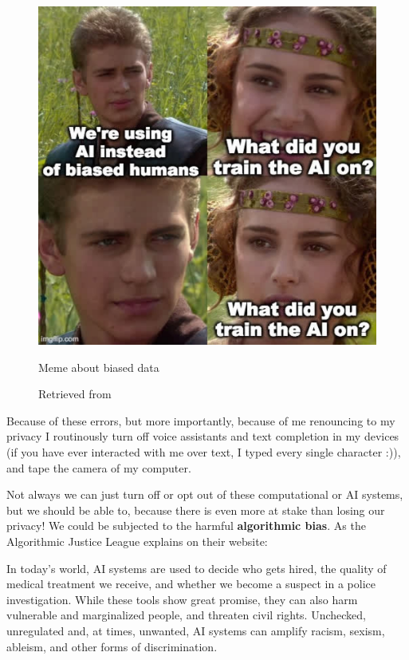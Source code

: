 \begin{figure}[ht]
  \centering
  \includegraphics[width=0.75\linewidth,height=0.25\textheight,keepaspectratio]{images/meme-star-wars.jpg}
  \caption{Meme about biased data}
  \caption*{Retrieved from \cite{website-twitter-janellecshane-meme}}
  \label{fig:meme-star-wars}
\end{figure}

Because of these errors, but more importantly, because of me renouncing to my privacy I routinously turn off voice assistants and text completion in my devices (if you have ever interacted with me over text, I typed every single character :)), and tape the camera of my computer.

Not always we can just turn off or opt out of these computational or \acrshort{AI} systems, but we should be able to, because there is even more at stake than losing our privacy! We could be subjected to the harmful \textbf{algorithmic bias}. As the Algorithmic Justice League explains on their website:

\begin{displayquote}
In today’s world, AI systems are used to decide who gets hired, the quality of medical treatment we receive, and whether we become a suspect in a police investigation. While these tools show great promise, they can also harm vulnerable and marginalized people, and threaten civil rights. Unchecked, unregulated and, at times, unwanted, AI systems can amplify racism, sexism, ableism, and other forms of discrimination.\cite{website-algorithmic-justice-league}
\end{displayquote}

